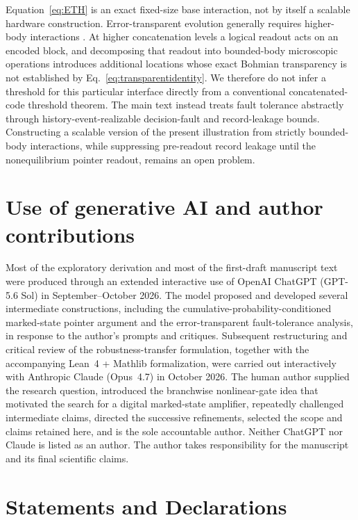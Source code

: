 \documentclass[pdflatex,sn-mathphys-num]{sn-jnl}
\theoremstyle{thmstyleone}
\begin{document}
Equation~\eqref{eq:ETH} is an exact fixed-size base interaction, not by itself a scalable hardware construction. Error-transparent evolution generally requires higher-body interactions \cite{VyWangJacobs2013}. At higher concatenation levels a logical readout acts on an encoded block, and decomposing that readout into bounded-body microscopic operations introduces additional locations whose exact Bohmian transparency is not established by Eq.~\eqref{eq:transparentidentity}. We therefore do not infer a threshold for this particular interface directly from a conventional concatenated-code threshold theorem. The main text instead treats fault tolerance abstractly through history-event-realizable decision-fault and record-leakage bounds. Constructing a scalable version of the present illustration from strictly bounded-body interactions, while suppressing pre-readout record leakage until the nonequilibrium pointer readout, remains an open problem.


\section{Use of generative AI and author contributions}

Most of the exploratory derivation and most of the first-draft manuscript text were produced through an extended interactive use of OpenAI ChatGPT (GPT-5.6 Sol) in September--October 2026. The model proposed and developed several intermediate constructions, including the cumulative-probability-conditioned marked-state pointer argument and the error-transparent fault-tolerance analysis, in response to the author's prompts and critiques. Subsequent restructuring and critical review of the robustness-transfer formulation, together with the accompanying Lean~4 + Mathlib formalization, were carried out interactively with Anthropic Claude (Opus~4.7) in October 2026. The human author supplied the research question, introduced the branchwise nonlinear-gate idea that motivated the search for a digital marked-state amplifier, repeatedly challenged intermediate claims, directed the successive refinements, selected the scope and claims retained here, and is the sole accountable author. Neither ChatGPT nor Claude is listed as an author. The author takes responsibility for the manuscript and its final scientific claims.

\section*{Statements and Declarations}
\end{document}
